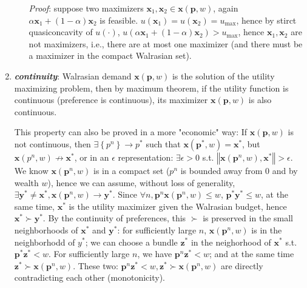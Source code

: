 \begin{enumerate}
\begin{enumerate}
        \textit{Proof}: suppose two maximizers $\mathbf{x}_1,\mathbf{x}_2\in\mathbf{x}(\mathbf{p},w)$, again $\alpha \mathbf{x}_1+(1-\alpha)\mathbf{x}_2$ is feasible. $u(\mathbf{x}_1)=u(\mathbf{x}_2)=u_{\max}$, hence by stirct quasiconcavity of $u(\cdot)$, $u(\alpha \mathbf{x}_1+(1-\alpha)\mathbf{x}_2)> u_{\max}$, hence $\mathbf{x}_1,\mathbf{x}_2$ are not maximizers, i.e., there are at most one maximizer (and there must be a maximizer in the compact Walrasian set).
    \end{enumerate}
    \item \textit{\textbf{continuity}}: Walrasian demand $\mathbf{x}(\mathbf{p},w)$ is the solution of the utility maximizing problem, then by maximum theorem, if the utility function is continuous (preference is continuous), its maximizer $\mathbf{x}(\mathbf{p},w)$ is also continuous. 
    
    This property can also be proved in a more "economic" way: If $\mathbf{x}(\mathbf{p},w)$ is not continuous, then $\exists\left\{p^n\right\}\rightarrow p^*$ such that $\mathbf{x}(\mathbf{p}^*,w)=\mathbf{x}^*$, but $\mathbf{x}(p^n,w)\not\rightarrow \mathbf{x}^*$, or in an $\epsilon$ representation: $\exists \epsilon>0$ s.t. $\left\Vert \mathbf{x}(\mathbf{p}^n,w),\mathbf{x}^* \right\Vert >\epsilon$. 
    We know $\mathbf{x}(\mathbf{p}^n,w)$ is in a compact set ($p^n$ is bounded away from 0 and by wealth $w$), hence we can assume, without loss of generality, $\exists \mathbf{y}^*\neq \mathbf{x}^*, \mathbf{x}(\mathbf{p}^n,w)\rightarrow \mathbf{y}^*$. Since $\forall n,\mathbf{p}^n\mathbf{x}(\mathbf{p}^n,w)\leq w$, $\mathbf{p}^*\mathbf{y}^* \leq w$, at the same time, $\mathbf{x}^*$ is the utility maximizer given the Walrasian budget, hence $\mathbf{x}^*\succ \mathbf{y}^*$.
    By the continuity of preferences, this $\succ$ is preserved in the small neighborhoods of $\mathbf{x}^*$ and $\mathbf{y}^*$: for sufficiently large $n$, $\mathbf{x}(\mathbf{p}^n,w)$ is in the neighborhodd of $y^*$; we can choose a bundle $\mathbf{z}^*$ in the neighorhood of $\mathbf{x}^*$ s.t. $\mathbf{p}^* \mathbf{z}^*<w$. For sufficiently large $n$, we have $\mathbf{p}^n\mathbf{z}^*<w$; and at the same time $\mathbf{z}^*\succ \mathbf{x}(\mathbf{p}^n,w)$. These two: $\mathbf{p}^n\mathbf{z}^*<w,\mathbf{z}^*\succ \mathbf{x}(\mathbf{p}^n,w)$ are directly contradicting each other (monotonicity).
\end{enumerate}

